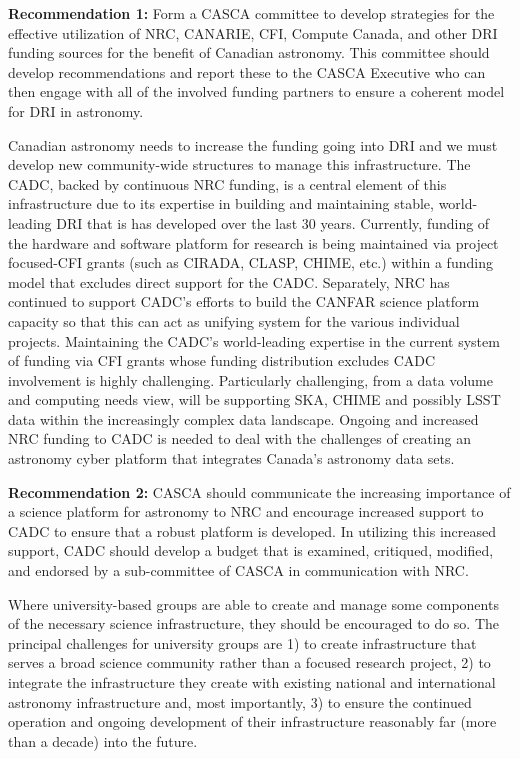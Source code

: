 \documentclass[11pt]{article}
\begin{document}
{\bf Recommendation 1:} Form a CASCA committee to develop strategies for the effective utilization of NRC, CANARIE, CFI, Compute Canada, and other DRI funding sources for the benefit of Canadian astronomy. This committee should develop recommendations and report these to the CASCA Executive who can then engage with all of the involved funding partners to ensure a coherent model for DRI in astronomy.

Canadian astronomy needs to increase the funding going into DRI and we must develop new community-wide structures to manage this infrastructure. 
The CADC, backed by continuous NRC funding, is a central element of this infrastructure due to its expertise in building and maintaining stable, world-leading DRI that is has developed over the last 30 years. 
Currently, funding of the hardware and software platform for research is being maintained via project focused-CFI grants (such as CIRADA, CLASP, CHIME, etc.) within a funding model that excludes direct support for the CADC.  
Separately, NRC has continued to support CADC's efforts to build the CANFAR science platform capacity so that this can act as unifying system for the various individual projects.
Maintaining the CADC's world-leading expertise in the current system of funding via CFI grants whose funding distribution excludes CADC involvement is highly challenging. 
Particularly challenging, from a data volume and computing needs view, will be supporting SKA, CHIME and possibly LSST data within the increasingly complex data landscape. 
Ongoing and increased NRC funding to CADC is needed to deal with the challenges of creating an astronomy cyber platform that integrates Canada's astronomy data sets. 

{\bf Recommendation 2:} CASCA should communicate the increasing importance of a science platform for astronomy to NRC and encourage increased support to CADC to ensure that a robust platform is developed. In utilizing this increased support, CADC should develop a budget that is examined, critiqued, modified, and endorsed by a sub-committee of CASCA in communication with NRC.

Where university-based groups are able to create and manage some components of the necessary science infrastructure, they should be encouraged to do so. The principal challenges for university groups are 1) to create infrastructure that serves a broad science community rather than a focused research project, 2) to integrate the infrastructure they create with existing national and international astronomy infrastructure and, most importantly, 3) to ensure the continued operation and ongoing development of their infrastructure reasonably far (more than a decade) into the future.
\end{document}

